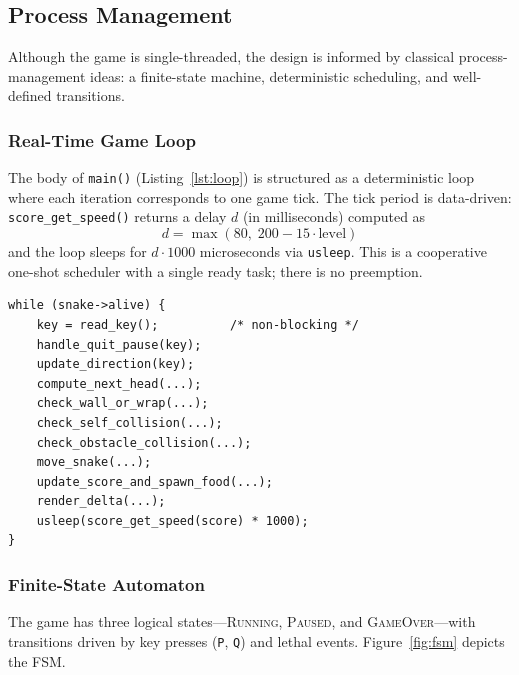 \documentclass[conference]{IEEEtran}
\begin{document}
\subsection{Process Management}
\label{sec:proc}

Although the game is single-threaded, the design is informed by classical process-management ideas: a finite-state machine, deterministic scheduling, and well-defined transitions.

\subsubsection{Real-Time Game Loop}
The body of \texttt{main()} (Listing~\ref{lst:loop}) is structured as a deterministic loop where each iteration corresponds to one game tick. The tick period is data-driven: \texttt{score\_get\_speed()} returns a delay $d$ (in milliseconds) computed as
\begin{equation}
d = \max\left(80,\; 200 - 15 \cdot \mathrm{level}\right)
\end{equation}
and the loop sleeps for $d \cdot 1000$ microseconds via \texttt{usleep}. This is a cooperative one-shot scheduler with a single ready task; there is no preemption.

\begin{lstlisting}[caption={Skeleton of the game-loop scheduler.},label={lst:loop}]
while (snake->alive) {
    key = read_key();          /* non-blocking */
    handle_quit_pause(key);
    update_direction(key);
    compute_next_head(...);
    check_wall_or_wrap(...);
    check_self_collision(...);
    check_obstacle_collision(...);
    move_snake(...);
    update_score_and_spawn_food(...);
    render_delta(...);
    usleep(score_get_speed(score) * 1000);
}
\end{lstlisting}

\subsubsection{Finite-State Automaton}
The game has three logical states---\textsc{Running}, \textsc{Paused}, and \textsc{GameOver}---with transitions driven by key presses (\texttt{P}, \texttt{Q}) and lethal events. Figure~\ref{fig:fsm} depicts the FSM.
\end{document}
